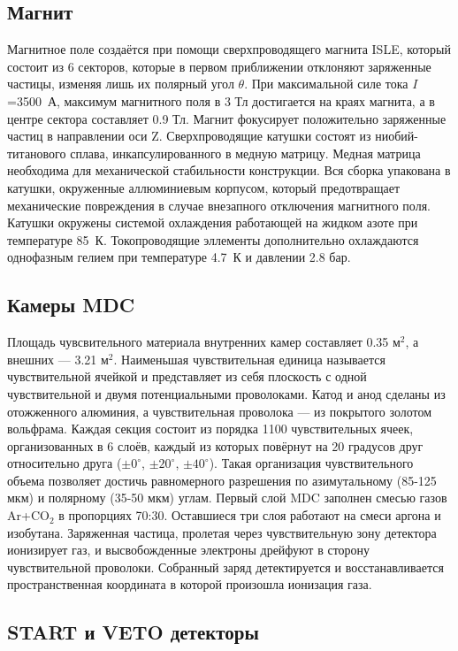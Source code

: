 \subsection{ Магнит }

Магнитное поле создаётся при помощи сверхпроводящего магнита ISLE, который состоит из 6 секторов, которые в первом приближении отклоняют заряженные частицы, изменяя лишь их полярный угол $\theta$.
При максимальной силе тока $I$=3500~А, максимум магнитного поля в 3 Тл достигается на краях магнита, а в центре сектора составляет 0.9 Тл.
Магнит фокусирует положительно заряженные частиц в направлении оси Z.
Сверхпроводящие катушки состоят из ниобий-титанового сплава, инкапсулированного в медную матрицу.
Медная матрица необходима для механической стабильности конструкции.
Вся сборка упакована в катушки, окруженные аллюминиевым корпусом, который предотвращает механические повреждения в случае внезапного отключения магнитного поля.
Катушки окружены системой охлаждения работающей на жидком азоте при температуре 85~К.
Токопроводящие эллементы дополнительно охлаждаются однофазным гелием при температуре 4.7~К и давлении 2.8 бар.

\subsection{ Камеры MDC }

Площадь чувсвительного материала внутренних камер составляет 0.35 м$^2$, а внешних --- 3.21 м$^2$.
Наименьшая чувствительная единица называется чувствительной ячейкой и представляет из себя плоскость с одной чувствительной и двумя потенциальными проволоками.
Катод и анод сделаны из отожженного алюминия, а чувствительная проволока --- из покрытого золотом вольфрама.
Каждая секция состоит из порядка 1100 чувствительных ячеек, организованных в 6 слоёв, каждый из которых повёрнут на 20 градусов друг относительно друга ($\pm0^{\circ}$, $\pm20^{\circ}$, $\pm40^{\circ}$).
Такая организация чувствительного объема позволяет достичь равномерного разрешения по азимутальному (85-125 мкм) и полярному (35-50 мкм) углам.
Первый слой MDC заполнен смесью газов Ar+CO$_{2}$ в пропорциях 70:30.
Оставшиеся три слоя работают на смеси аргона и изобутана. 
Заряженная частица, пролетая через чувствительную зону детектора ионизирует газ, и высвобожденные электроны дрейфуют в сторону чувствительной проволоки.
Собранный заряд детектируется и восстанавливается пространственная координата в которой произошла ионизация газа.

\subsection{START и VETO детекторы}

